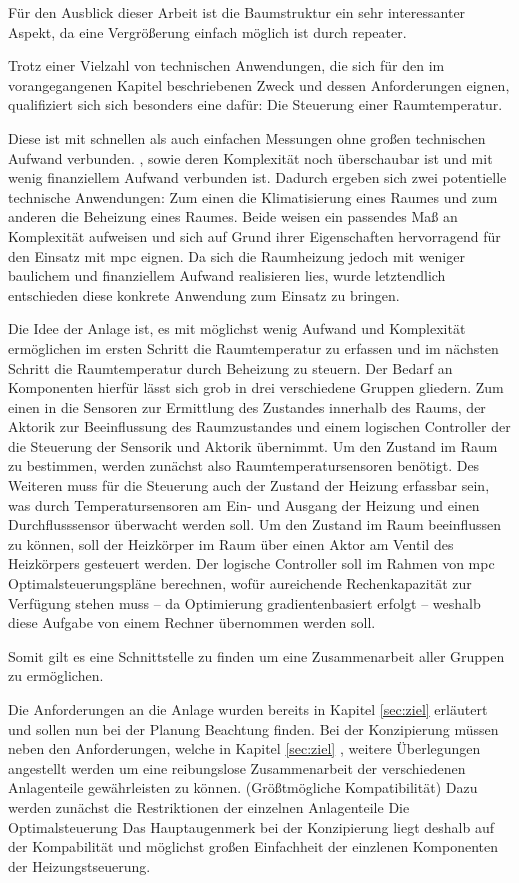  Für den Ausblick dieser Arbeit ist die Baumstruktur ein sehr interessanter Aspekt, da eine Vergrößerung einfach möglich ist durch repeater.


Trotz einer Vielzahl von technischen Anwendungen, die sich für den im vorangegangenen Kapitel beschriebenen Zweck und dessen Anforderungen eignen, qualifiziert sich  sich besonders eine dafür: Die Steuerung einer Raumtemperatur.

Diese ist mit schnellen als auch einfachen Messungen ohne großen technischen Aufwand verbunden.
, sowie deren Komplexität noch überschaubar ist und mit wenig finanziellem Aufwand verbunden ist. Dadurch ergeben sich zwei potentielle technische Anwendungen: Zum einen die Klimatisierung eines Raumes und zum anderen die Beheizung eines Raumes. Beide weisen ein passendes Maß an Komplexität aufweisen und sich auf Grund ihrer Eigenschaften hervorragend für den Einsatz mit \acrlong{mpc} eignen. Da sich die Raumheizung jedoch mit weniger baulichem und finanziellem Aufwand realisieren lies, wurde letztendlich entschieden diese konkrete Anwendung zum Einsatz zu bringen.


Die Idee der Anlage ist, es mit möglichst wenig Aufwand und Komplexität ermöglichen im ersten Schritt die Raumtemperatur zu erfassen und im nächsten Schritt die Raumtemperatur durch Beheizung zu steuern. Der Bedarf an Komponenten hierfür lässt sich grob in drei verschiedene Gruppen gliedern. Zum einen in die Sensoren zur Ermittlung des Zustandes innerhalb des Raums, der Aktorik zur Beeinflussung des Raumzustandes und einem logischen Controller der die Steuerung der Sensorik und Aktorik übernimmt.
Um den Zustand im Raum zu bestimmen, werden zunächst also Raumtemperatursensoren benötigt. Des Weiteren muss für die Steuerung auch der Zustand der Heizung erfassbar sein, was durch Temperatursensoren am Ein- und Ausgang der Heizung und einen Durchflusssensor überwacht werden soll.
Um den Zustand im Raum beeinflussen zu können, soll der Heizkörper im Raum über einen Aktor am Ventil des Heizkörpers gesteuert werden.
Der logische Controller soll im Rahmen von \acrlong{mpc} Optimalsteuerungspläne berechnen, wofür aureichende Rechenkapazität zur Verfügung stehen muss -- da Optimierung gradientenbasiert erfolgt -- weshalb diese Aufgabe von einem Rechner übernommen werden soll.

Somit gilt es eine Schnittstelle zu finden um eine Zusammenarbeit aller Gruppen zu ermöglichen.

Die Anforderungen an die Anlage wurden bereits in Kapitel \ref{sec:ziel} erläutert und sollen nun bei der Planung Beachtung finden.
Bei der Konzipierung müssen neben den Anforderungen, welche in Kapitel \ref{sec:ziel} , weitere Überlegungen angestellt werden um eine reibungslose Zusammenarbeit der verschiedenen Anlagenteile gewährleisten zu können. (Größtmögliche Kompatibilität)
Dazu werden zunächst die Restriktionen der einzelnen Anlagenteile
Die Optimalsteuerung 
Das Hauptaugenmerk bei der Konzipierung liegt deshalb auf der Kompabilität und möglichst großen Einfachheit der einzlenen Komponenten der Heizungstseuerung. 



